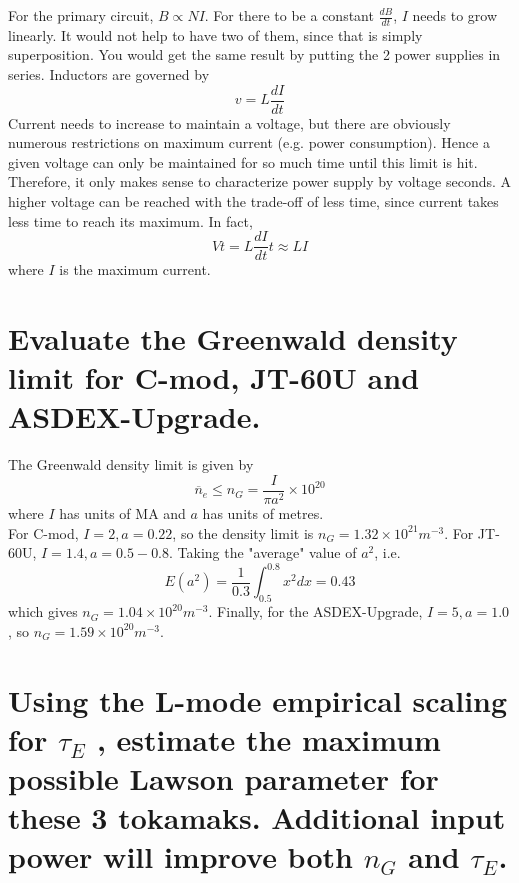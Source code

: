 \documentclass[answers]{exam}
\begin{document}
\begin{questions}
\begin{parts}

\begin{solution}
    For the primary circuit, $B \propto NI$. For there to be a constant $\frac{dB}{dt}$, $I$ needs to grow linearly. It would not help to have two of them, since that is simply superposition. You would get the same result by putting the 2 power supplies in series. Inductors are governed by
    $$v = L \frac{dI}{dt}$$
    Current needs to increase to maintain a voltage, but there are obviously numerous restrictions on maximum current (e.g. power consumption). Hence a given voltage can only be maintained for so much time until this limit is hit. Therefore, it only makes sense to characterize power supply by voltage seconds. A higher voltage can be reached with the trade-off of less time, since current takes less time to reach its maximum. In fact,
    $$Vt = L \frac{dI}{dt}t \approx LI$$
    where $I$ is the maximum current.
\end{solution}

\end{parts}

\question{}

\begin{parts}

\part{Evaluate the Greenwald density limit for C-mod, JT-60U and ASDEX-Upgrade.}

\begin{solution}
    The Greenwald density limit is given by
    $$\overline n_e \leq n_G = \frac{I}{\pi a^2} \times 10^{20}$$
    where $I$ has units of MA and $a$ has units of metres. \\
    For C-mod, $I = 2, a = 0.22$, so the density limit is $n_G = 1.32 \times 10^{21} \unit{m^{-3}}$. For JT-60U, $I = 1.4, a = 0.5-0.8$. Taking the "average" value of $a^2$, i.e.
    $$E(a^2) = \frac{1}{0.3} \int_{0.5}^{0.8} x^2dx = 0.43$$
    which gives $n_G = 1.04 \times 10^{20} \unit{m^{-3}}$. Finally, for the ASDEX-Upgrade, $I = 5, a = 1.0$, so $n_G = 1.59 \times 10^{20} \unit{m^{-3}}$.
\end{solution}

\part{Using the L-mode empirical scaling for $\tau_E$ , estimate the maximum possible Lawson parameter for these 3 tokamaks. Additional input power will improve both $n_G$ and $\tau_E$.}


\end{parts}
\end{questions}
\end{document}
